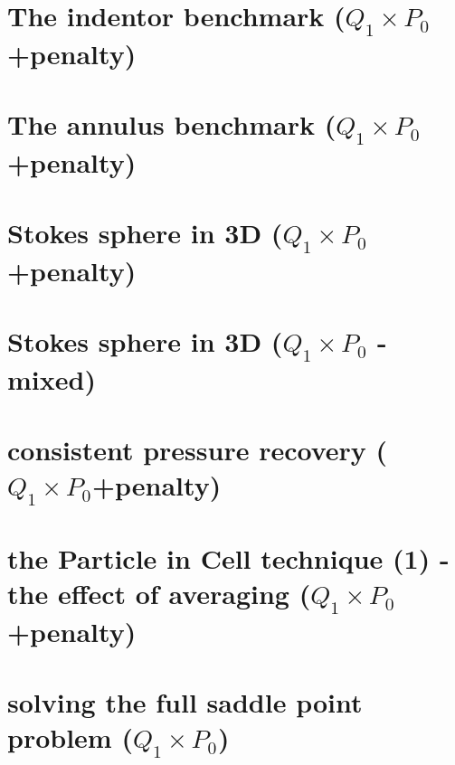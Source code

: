 \documentclass[a4paper,11pt]{report}
\begin{document}
\chapter{The indentor benchmark ($Q_1\times P_0$+penalty)\label{f08}} %
 
\chapter{The annulus benchmark ($Q_1\times P_0$+penalty) \label{f09}} %

\chapter{Stokes sphere in 3D ($Q_1 \times P_0$+penalty)\label{f10}} %

\chapter{Stokes sphere in 3D ($Q_1\times P_0$ - mixed) \label{f11}} %

\chapter{consistent pressure recovery ($Q_1\times P_0$+penalty)\label{f12}} %

\chapter{the Particle in Cell technique (1) - the effect of averaging ($Q_1\times P_0$+penalty)\label{f13}} %

\chapter{solving the full saddle point problem ($Q_1\times P_0$) \label{f14}} %
\end{document}
